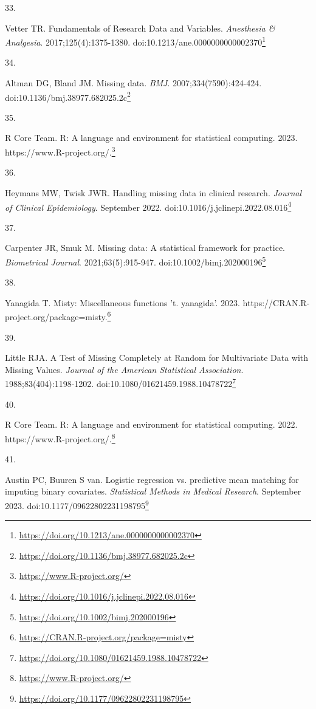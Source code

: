 \documentclass[
  a4paper,
]{book}
\newlength{\cslhangindent}
\newlength{\csllabelwidth}
\newlength{\cslentryspacingunit} %
\newenvironment{CSLReferences}[2] %
 {%
  \setlength{\parindent}{0pt}
  \ifodd #1
  \let\oldpar\par
  \def\par{\hangindent=\cslhangindent\oldpar}
  \fi
  \setlength{\parskip}{#2\cslentryspacingunit}
 }%
 {}
\newcommand{\CSLLeftMargin}[1]{\parbox[t]{\csllabelwidth}{#1}}
\newcommand{\CSLRightInline}[1]{\parbox[t]{\linewidth - \csllabelwidth}{#1}\break}
\renewcommand{\href}[2]{#2\footnote{\url{#1}}}
\begin{document}
\begin{CSLReferences}{0}{0}
\leavevmode{}%
\CSLLeftMargin{33. }%
\CSLRightInline{Vetter TR. Fundamentals of Research Data and Variables. \emph{Anesthesia \& Analgesia}. 2017;125(4):1375-1380. doi:\href{https://doi.org/10.1213/ane.0000000000002370}{10.1213/ane.0000000000002370}}

\leavevmode{}%
\CSLLeftMargin{34. }%
\CSLRightInline{Altman DG, Bland JM. Missing data. \emph{BMJ}. 2007;334(7590):424-424. doi:\href{https://doi.org/10.1136/bmj.38977.682025.2c}{10.1136/bmj.38977.682025.2c}}

\leavevmode{}%
\CSLLeftMargin{35. }%
\CSLRightInline{R Core Team. R: A language and environment for statistical computing. 2023. \href{https://www.R-project.org/}{https://www.R-project.org/.}}

\leavevmode{}%
\CSLLeftMargin{36. }%
\CSLRightInline{Heymans MW, Twisk JWR. Handling missing data in clinical research. \emph{Journal of Clinical Epidemiology}. September 2022. doi:\href{https://doi.org/10.1016/j.jclinepi.2022.08.016}{10.1016/j.jclinepi.2022.08.016}}

\leavevmode{}%
\CSLLeftMargin{37. }%
\CSLRightInline{Carpenter JR, Smuk M. Missing data: A statistical framework for practice. \emph{Biometrical Journal}. 2021;63(5):915-947. doi:\href{https://doi.org/10.1002/bimj.202000196}{10.1002/bimj.202000196}}

\leavevmode{}%
\CSLLeftMargin{38. }%
\CSLRightInline{Yanagida T. Misty: Miscellaneous functions 't. yanagida'. 2023. \href{https://CRAN.R-project.org/package=misty}{https://CRAN.R-project.org/package=misty.}}

\leavevmode{}%
\CSLLeftMargin{39. }%
\CSLRightInline{Little RJA. A Test of Missing Completely at Random for Multivariate Data with Missing Values. \emph{Journal of the American Statistical Association}. 1988;83(404):1198-1202. doi:\href{https://doi.org/10.1080/01621459.1988.10478722}{10.1080/01621459.1988.10478722}}

\leavevmode{}%
\CSLLeftMargin{40. }%
\CSLRightInline{R Core Team. R: A language and environment for statistical computing. 2022. \href{https://www.R-project.org/}{https://www.R-project.org/.}}

\leavevmode{}%
\CSLLeftMargin{41. }%
\CSLRightInline{Austin PC, Buuren S van. Logistic regression vs. predictive mean matching for imputing binary covariates. \emph{Statistical Methods in Medical Research}. September 2023. doi:\href{https://doi.org/10.1177/09622802231198795}{10.1177/09622802231198795}}


\end{CSLReferences}
\end{document}
